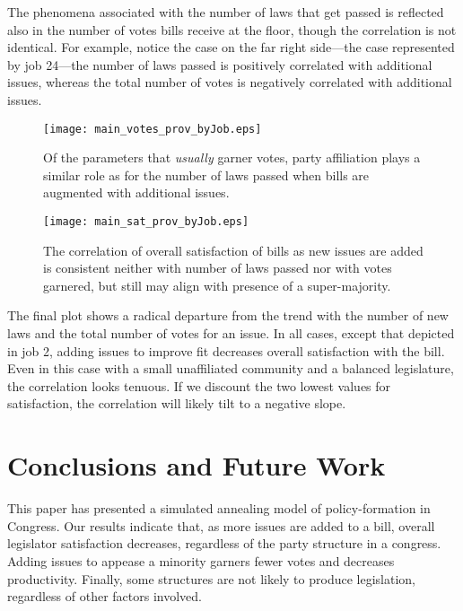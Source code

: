 \documentclass[pdftex,12pt]{llncs}
\begin{document}
The phenomena associated with the number of laws that get passed is reflected also in the number of votes bills receive at the floor, though the correlation is not identical. 
For example, notice the case on the far right side---the case represented by job 24---the number of laws passed is positively correlated with additional issues, whereas the total number of votes is negatively correlated with additional issues. 


\begin{figure}%
 \centering
  \texttt{[image: main\_votes\_prov\_byJob.eps]}
\caption[ ]{Of the parameters that \textit{usually} garner votes, party affiliation plays a similar role as for the number of laws passed when bills are augmented with additional issues.}
 \label{numvotes}
\end{figure}

\begin{figure}%
 \centering
  \texttt{[image: main\_sat\_prov\_byJob.eps]}
\caption[ ]{The correlation of overall satisfaction of bills as new issues are added is consistent neither with number of laws passed nor with votes garnered, but still may align with presence of a super-majority.}
 \label{satisfaction}
\end{figure}

The final plot shows a radical departure from the trend with the number of new laws and the total number of votes for an issue. 
In all cases, except that depicted in job 2, adding issues to improve fit decreases overall satisfaction with the bill. 
Even in this case with a small unaffiliated community and a balanced legislature, the correlation looks tenuous. 
If we discount the two lowest values for satisfaction, the correlation will likely tilt to a negative slope. 


\section{Conclusions and Future Work}

This paper has presented a simulated annealing model of policy-formation in Congress. 
Our results indicate that, as more issues are added to a bill, overall legislator satisfaction decreases, regardless of the party structure in a congress. 
Adding issues to appease a minority garners fewer votes and decreases productivity. 
Finally, some structures are not likely to produce legislation, regardless of other factors involved. 
\end{document}
